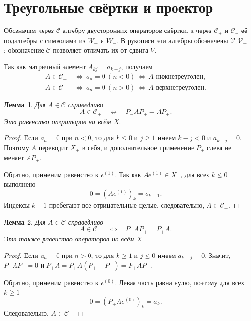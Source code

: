 \documentclass[12pt,a4paper]{article}
\newtheorem{lemma}{Лемма}
\theoremstyle{definition}
\theoremstyle{remark}
\newcommand{\Conv}{\mathcal C}
\begin{document}
\section{Треугольные свёртки и проектор}

Обозначим через $\Conv$ алгебру двусторонних операторов свёртки,
а через $\Conv_+$ и $\Conv_-$ её подалгебры с символами из $W_+$
и $W_-$. В рукописи эти алгебры обозначены $\mathcal V,\mathcal V_\pm$;
обозначение $\Conv$ позволяет отличать их от сдвига $V$.

Так как матричный элемент $A_{kj}=a_{k-j}$, получаем
\begin{align*}
  A\in\Conv_+&\ \Longleftrightarrow\ a_n=0\ (n<0)
     \ \Longleftrightarrow\ A\text{ нижнетреуголен},\\
  A\in\Conv_-&\ \Longleftrightarrow\ a_n=0\ (n>0)
     \ \Longleftrightarrow\ A\text{ верхнетреуголен}.
\end{align*}

\begin{lemma}
Для $A\in\Conv$ справедливо
\[
  \boxed{A\in\Conv_+\quad\Longleftrightarrow\quad P_+AP_+=AP_+}.
\]
Это равенство операторов на всём $X$.
\end{lemma}

\begin{proof}
Если $a_n=0$ при $n<0$, то для $k\leqslant0$ и $j\geqslant1$
имеем $k-j<0$ и $a_{k-j}=0$. Поэтому $A$ переводит $X_+$ в себя,
и дополнительное применение $P_+$ слева не меняет $AP_+$.

Обратно, применим равенство к $e^{(1)}$. Так как
$Ae^{(1)}\in X_+$, для всех $k\leqslant0$ выполнено
\[
  0=(Ae^{(1)})_k=a_{k-1}.
\]
Индексы $k-1$ пробегают все отрицательные целые, следовательно,
$A\in\Conv_+$.
\end{proof}

\begin{lemma}
Для $A\in\Conv$ справедливо
\[
  \boxed{A\in\Conv_-\quad\Longleftrightarrow\quad P_+AP_+=P_+A}.
\]
Это также равенство операторов на всём $X$.
\end{lemma}

\begin{proof}
Если $a_n=0$ при $n>0$, то для $k\geqslant1$ и $j\leqslant0$
имеем $a_{k-j}=0$. Значит, $P_+AP_-=0$ и
$P_+A=P_+A(P_++P_-)=P_+AP_+$.

Обратно, применим равенство к $e^{(0)}$. Левая часть равна нулю,
поэтому для всех $k\geqslant1$
\[
  0=(P_+Ae^{(0)})_k=a_k.
\]
Следовательно, $A\in\Conv_-$.
\end{proof}
\end{document}
